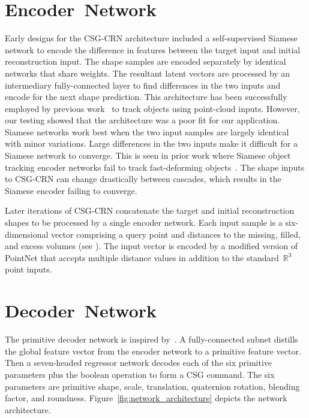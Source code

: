 \section{Encoder~Network}
\label{subsec:encoder_network_method}

Early designs for the CSG-CRN architecture included a self-supervised Siamese network to encode the difference in features between the target input and initial reconstruction input. The shape samples are encoded separately by identical networks that share weights. The resultant latent vectors are processed by an intermediary fully-connected layer to find differences in the two inputs and encode for the next shape prediction. This architecture has been successfully employed by previous work~\cite{Cui2020, Sarode2019} to track objects using point-cloud inputs. However, our testing showed that the architecture was a poor fit for our application. Siamese networks work best when the two input samples are largely identical with minor variations. Large differences in the two inputs make it difficult for a Siamese network to converge. This is seen in prior work where Siamese object tracking encoder networks fail to track fast-deforming objects~\cite{Cui2020}. The shape inputs to CSG-CRN can change drastically between cascades, which results in the Siamese encoder failing to converge.

Later iterations of CSG-CRN concatenate the target and initial reconstruction shapes to be processed by a single encoder network. Each input sample is a six-dimensional vector comprising a query point and distances to the missing, filled, and excess volumes (see ). The input vector is encoded by a modified version of PointNet that accepts multiple distance values in addition to the standard~$\mathbb{R}^3$ point inputs.

\section{Decoder~Network}
\label{subsec:decoder_network_method}

The primitive decoder network is inspired by~\cite{Paschalidou2019}. A fully-connected subnet distills the global feature vector from the encoder network to a primitive feature vector. Then a seven-headed regressor network decodes each of the six primitive parameters plus the boolean operation to form a CSG command. The six parameters are primitive shape, scale, translation, quaternion rotation, blending factor, and roundness. Figure~\ref{fig:network_architecture} depicts the network architecture.

